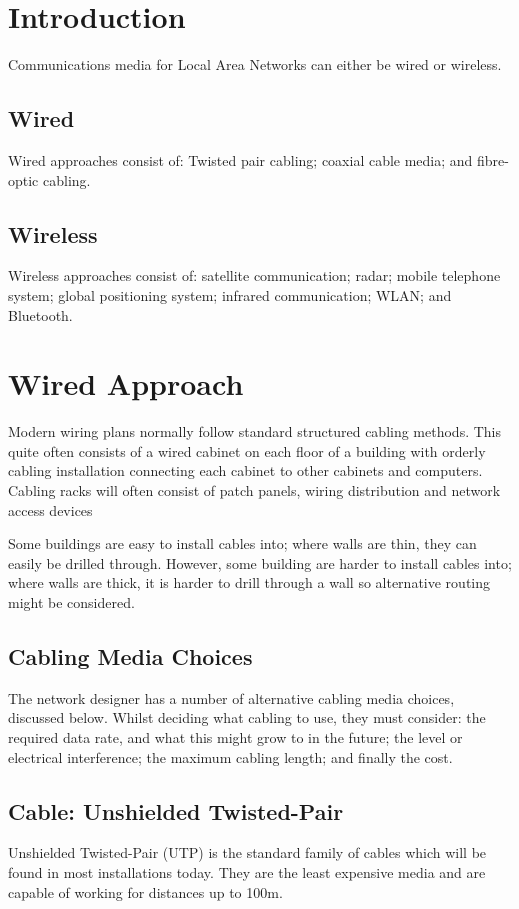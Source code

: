 
\section*{Introduction}
Communications media for Local Area Networks can either be wired or wireless.
\subsection*{Wired}
Wired approaches consist of: Twisted pair cabling; coaxial cable media; and fibre-optic cabling.
\subsection*{Wireless}
Wireless approaches consist of: satellite communication; radar; mobile telephone system; global positioning system; infrared communication; WLAN; and Bluetooth.

\section*{Wired Approach}
Modern wiring plans normally follow standard structured cabling methods. This quite often consists of a wired cabinet on each floor of a building with orderly cabling installation connecting each cabinet to other cabinets and computers. Cabling racks will often consist of patch panels, wiring distribution and network access devices

Some buildings are easy to install cables into; where walls are thin, they can easily be drilled through. However, some building are harder to install cables into; where walls are thick, it is harder to drill through a wall so alternative routing might be considered.
\subsection*{Cabling Media Choices}
The network designer has a number of alternative cabling media choices, discussed below. Whilst deciding what cabling to use, they must consider: the required data rate, and what this might grow to in the future; the level or electrical interference; the maximum cabling length; and finally the cost.
\subsection*{Cable: Unshielded Twisted-Pair}
Unshielded Twisted-Pair (UTP) is the standard family of cables which will be found in most installations today. They are the least expensive media and are capable of working for distances up to 100m.

